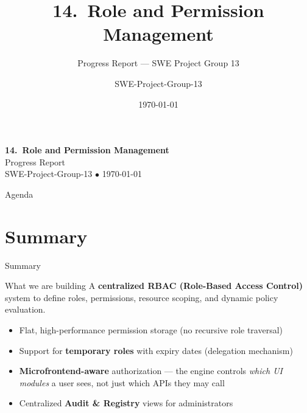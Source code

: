 \documentclass[aspectratio=169]{beamer}
\title[RBAC Progress Report]{14.\ Role and Permission Management}
\subtitle{Progress Report --- SWE Project Group 13}
\author[Group 13]{SWE-Project-Group-13}
\date{\today}
\begin{document}

{
\begin{frame}
  \vspace{0.8cm}
  \begin{center}
    {\color{white}\Large\bfseries 14.\ Role and Permission Management}\\[0.3cm]
    {\color{HighlightCyan}\normalsize Progress Report}\\[0.2cm]
    {\color{white!80}\small SWE-Project-Group-13 \quad $\bullet$ \quad \today}
  \end{center}
  \vspace{0.4cm}
\end{frame}
}

\begin{frame}{Agenda}
  \tableofcontents
\end{frame}

\section{Summary}
\begin{frame}{Summary}
  \begin{block}{What we are building}
    A \textbf{centralized RBAC (Role-Based Access Control)} system to define roles,
    permissions, resource scoping, and dynamic policy evaluation.
  \end{block}
  \vspace{0.4cm}
  \begin{itemize}
    \item Flat, high-performance permission storage (no recursive role traversal)
    \item Support for \textbf{temporary roles} with expiry dates (delegation mechanism)
    \item \textbf{Microfrontend-aware} authorization --- the engine controls \emph{which UI modules}
          a user sees, not just which APIs they may call
    \item Centralized \textbf{Audit \& Registry} views for administrators
  \end{itemize}
\end{frame}
\end{document}
